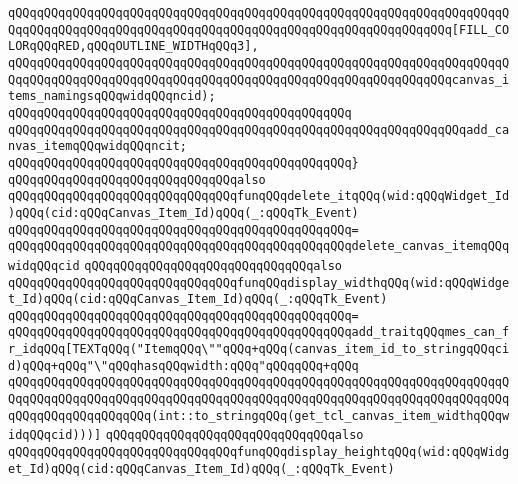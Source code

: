 \verb|qQQqqQQqqQQqqQQqqQQqqQQqqQQqqQQqqQQqqQQqqQQqqQQqqQQqqQQqqQQqqQQqqQQqqQQqqQQqqQQqqQQqqQQqqQQqqQQqqQQqqQQqqQQqqQQqqQQqqQQqqQQqqQQqqQQq[FILL_COLORqQQqRED,qQQqOUTLINE_WIDTHqQQq3],|\newline
\verb|qQQqqQQqqQQqqQQqqQQqqQQqqQQqqQQqqQQqqQQqqQQqqQQqqQQqqQQqqQQqqQQqqQQqqQQqqQQqqQQqqQQqqQQqqQQqqQQqqQQqqQQqqQQqqQQqqQQqqQQqqQQqqQQqqQQqcanvas_items_namingsqQQqwidqQQqncid);|\newline
\verb|qQQqqQQqqQQqqQQqqQQqqQQqqQQqqQQqqQQqqQQqqQQqqQQq|\newline
\verb|qQQqqQQqqQQqqQQqqQQqqQQqqQQqqQQqqQQqqQQqqQQqqQQqqQQqqQQqqQQqqQQqadd_canvas_itemqQQqwidqQQqncit;|\newline
\verb|qQQqqQQqqQQqqQQqqQQqqQQqqQQqqQQqqQQqqQQqqQQqqQQq}|\newline
\newline
\verb|qQQqqQQqqQQqqQQqqQQqqQQqqQQqqQQqalso|\newline
\verb|qQQqqQQqqQQqqQQqqQQqqQQqqQQqqQQqfunqQQqdelete_itqQQq(wid:qQQqWidget_Id)qQQq(cid:qQQqCanvas_Item_Id)qQQq(_:qQQqTk_Event)|\newline
\verb|qQQqqQQqqQQqqQQqqQQqqQQqqQQqqQQqqQQqqQQqqQQqqQQq=|\newline
\verb|qQQqqQQqqQQqqQQqqQQqqQQqqQQqqQQqqQQqqQQqqQQqqQQqdelete_canvas_itemqQQqwidqQQqcid|\newline
\newline
\verb|qQQqqQQqqQQqqQQqqQQqqQQqqQQqqQQqalso|\newline
\verb|qQQqqQQqqQQqqQQqqQQqqQQqqQQqqQQqfunqQQqdisplay_widthqQQq(wid:qQQqWidget_Id)qQQq(cid:qQQqCanvas_Item_Id)qQQq(_:qQQqTk_Event)|\newline
\verb|qQQqqQQqqQQqqQQqqQQqqQQqqQQqqQQqqQQqqQQqqQQqqQQq=|\newline
\verb|qQQqqQQqqQQqqQQqqQQqqQQqqQQqqQQqqQQqqQQqqQQqqQQqadd_traitqQQqmes_can_fr_idqQQq[TEXTqQQq("ItemqQQq\""qQQq+qQQq(canvas_item_id_to_stringqQQqcid)qQQq+qQQq"\"qQQqhasqQQqwidth:qQQq"qQQqqQQq+qQQq|\newline
\verb|qQQqqQQqqQQqqQQqqQQqqQQqqQQqqQQqqQQqqQQqqQQqqQQqqQQqqQQqqQQqqQQqqQQqqQQqqQQqqQQqqQQqqQQqqQQqqQQqqQQqqQQqqQQqqQQqqQQqqQQqqQQqqQQqqQQqqQQqqQQqqQQqqQQqqQQqqQQqqQQq(int::to_stringqQQq(get_tcl_canvas_item_widthqQQqwidqQQqcid)))]|\newline
\newline
\verb|qQQqqQQqqQQqqQQqqQQqqQQqqQQqqQQqalso|\newline
\verb|qQQqqQQqqQQqqQQqqQQqqQQqqQQqqQQqfunqQQqdisplay_heightqQQq(wid:qQQqWidget_Id)qQQq(cid:qQQqCanvas_Item_Id)qQQq(_:qQQqTk_Event)|\newline
